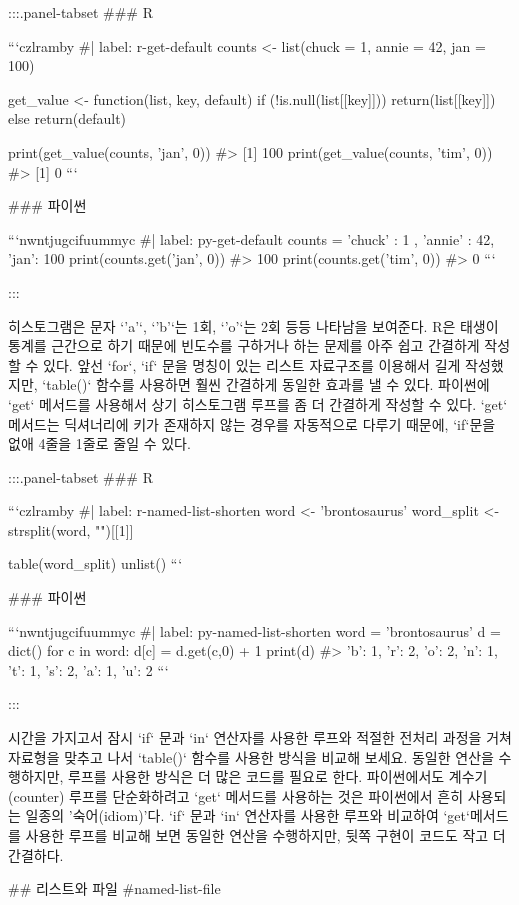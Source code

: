 \documentclass[
  letterpaper,
]{book}
\begin{document}
{:::{.panel-tabset}
### R

```czlramby
#| label: r-get-default
counts <- list(chuck = 1, annie = 42, jan = 100)

get_value <- function(list, key, default) {
  if (!is.null(list[[key]])) {
    return(list[[key]])
  } else {
    return(default)
  }
}

print(get_value(counts, 'jan', 0))
#> [1] 100
print(get_value(counts, 'tim', 0))
#> [1] 0
```

### 파이썬

```nwntjugcifuummyc
#| label: py-get-default
counts = { 'chuck' : 1 , 'annie' : 42, 'jan': 100}
print(counts.get('jan', 0))
#> 100
print(counts.get('tim', 0))
#> 0
```

:::

히스토그램은 문자 `'a'`, `'b'`는 1회, `'o'`는 2회 등등 나타남을 보여준다. 
R은 태생이 통계를 근간으로 하기 때문에 빈도수를 구하거나 하는 문제를 아주 쉽고 간결하게 작성할 수 있다. 
앞선 `for`, `if` 문을 명칭이 있는 리스트 자료구조를 이용해서 길게 작성했지만, 
`table()` 함수를 사용하면 훨씬 간결하게 동일한 효과를 낼 수 있다. 
파이썬에 `get` 메서드를 사용해서 상기 히스토그램 루프를 좀 더 간결하게 작성할 수 있다. 
`get` 메서드는 딕셔너리에 키가 존재하지 않는 경우를 자동적으로 다루기 때문에, `if`문을 없애 4줄을 1줄로 줄일 수 있다.

:::{.panel-tabset}
### R

```czlramby
#| label: r-named-list-shorten
word <- 'brontosaurus'
word_split <- strsplit(word, "")[[1]]

table(word_split) %
  unlist()
```

### 파이썬

```nwntjugcifuummyc
#| label: py-named-list-shorten
word = 'brontosaurus'
d = dict()
for c in word:
  d[c] = d.get(c,0) + 1
print(d)
#> {'b': 1, 'r': 2, 'o': 2, 'n': 1, 't': 1, 's': 2, 'a': 1, 'u': 2}
```

:::

시간을 가지고서 잠시 `if` 문과 `in` 연산자를 사용한 루프와 적절한 전처리 과정을 거쳐 자료형을 맞추고 나서 `table()` 함수를 사용한 방식을 비교해 보세요. 
동일한 연산을 수행하지만, 루프를 사용한 방식은 더 많은 코드를 필요로 한다. 
파이썬에서도 계수기(counter) 루프를 단순화하려고 `get` 메서드를 사용하는 것은 파이썬에서 흔히 사용되는 일종의 '숙어(idiom)'다. 
`if` 문과 `in` 연산자를 사용한 루프와 비교하여 `get`메서드를 사용한 루프를 비교해 보면 동일한 연산을 수행하지만, 뒷쪽 구현이 코드도 작고 더 간결하다.

## 리스트와 파일 {#named-list-file}

}
\end{document}
